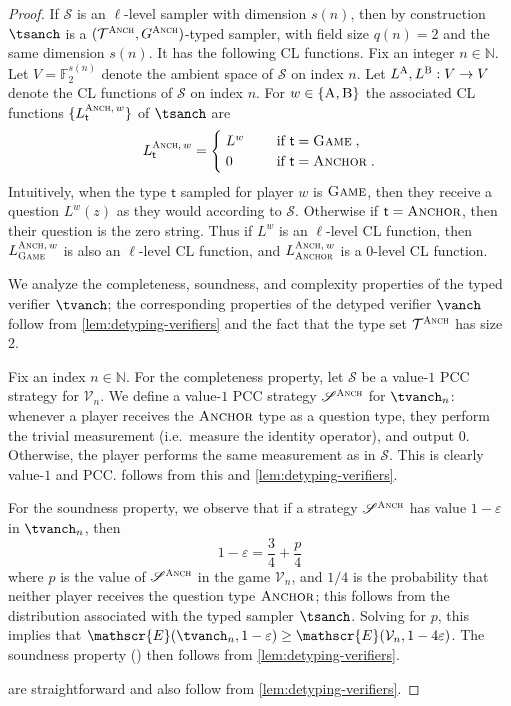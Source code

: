 \documentclass[11pt]{article}
\theoremstyle{definition}
\newcommand{\N}{\ensuremath{\mathbb{N}}}
\newcommand{\F}{\ensuremath{\mathbb{F}}}
\newcommand{\eps}{\varepsilon}
\newcommand{\sampler}{\mathcal{S}}
\newcommand{\verifier}{\mathcal{V}}
\newcommand{\strategy}{\mathscr{S}}
\newcommand{\type}{\mathcal{T}}
\newcommand{\gamestyle}[1]{\ensuremath{\textsc{#1}}\xspace}
\newcommand{\labelstyle}[1]{\ensuremath{\textsc{#1}}\xspace}
\newcommand{\tvarstyle}[1]{\mathsf{#1}}
\newcommand{\tvar}{\ensuremath{\tvarstyle{t}}}
\newcommand{\alice}{\labelstyle{A}}
\newcommand{\bob}{\labelstyle{B}}
\newcommand{\typestyle}[1]{\ensuremath{\textsc{#1}}\xspace}
\newcommand{\Anchor}{\typestyle{Anchor}}
\renewcommand{\Game}{\typestyle{Game}}
\newcommand{\Ent}{\mathscr{E}}
\newcommand{\anch}{\gamestyle{Anch}}
\begin{document}
\begin{proof}
If $\sampler$ is an $\ell$-level sampler with dimension $s(n)$, then by construction $\tsanch$ is a $(\type^\anch, G^\anch)$-typed sampler, with
field size $q(n) = 2$ and the same dimension $s(n)$. It has the following CL functions. Fix an integer $n \in \N$.
Let $V = \F_2^{s(n)}$ denote the ambient space of $\sampler$ on index $n$.
Let $L^\alice, L^\bob: V \to V$ denote the CL functions of $\sampler$ on index
$n$.
For $w\in\{\alice,\bob\}$ the associated CL functions $\{ L^{\anch,\, w}_\tvar
\}$ of $\tsanch$ are
\begin{equation*}
	L^{\anch,\, w}_\tvar =
  \begin{cases}
		 \; L^w & \quad \text{ if } \tvar = \Game \;, \\
		 \; 0 & \quad \text{ if } \tvar = \Anchor \;.
	\end{cases}
\end{equation*}
Intuitively, when the type $\tvar$ sampled for player $w$ is $\Game$, then they
receive a question $L^w(z)$ as they would according to $\sampler$.
Otherwise if $\tvar = \Anchor$, then their question is the zero string.
Thus if $L^w$ is an $\ell$-level CL function, then $L^{\anch,\, w}_\Game$ is
also an $\ell$-level CL function, and $L^{\anch,\, w}_\Anchor$ is a $0$-level CL
function.

  We analyze the completeness, soundness, and complexity properties of the typed
  verifier $\tvanch$; the corresponding properties of the
  detyped verifier $\vanch$ follow from
  \cref{lem:detyping-verifiers} and the fact that the type set
  $\type^\anch$ has size $2$.

  Fix an index $n \in \N$.
  For the completeness property, let $\strategy$ be a value-$1$ PCC strategy for
  $\verifier_n$.
  We define a value-$1$ PCC strategy $\strategy^\anch$ for
  $\tvanch_n$: whenever a player receives the $\Anchor$ type as
  a question type, they perform the trivial measurement (i.e.\ measure the
  identity operator), and output $0$.
  Otherwise, the player performs the same measurement as in $\strategy$.
  This is clearly value-$1$ and PCC.
   follows from this and
  \cref{lem:detyping-verifiers}.

  For the soundness property, we observe that if a strategy $\strategy^\anch$
  has value $1 - \eps$ in $\tvanch_n$, then
  \[ 1 - \eps = \frac{3}{4} + \frac{p}{4} \]
  where $p$ is the value of $\strategy^\anch$ in the game $\verifier_n$, and
  $1/4$ is the probability that neither player receives the question
  type $\Anchor$; this follows from the distribution associated with the typed
  sampler $\tsanch$.
  Solving for $p$, this implies that $\Ent(\tvanch_n,1 - \eps) \geq \Ent(\verifier_n,1 - 4\eps)$.
  The soundness property () then follows from \cref{lem:detyping-verifiers}.
  


   are
  straightforward and also follow from \cref{lem:detyping-verifiers}.
\end{proof}
\end{document}
